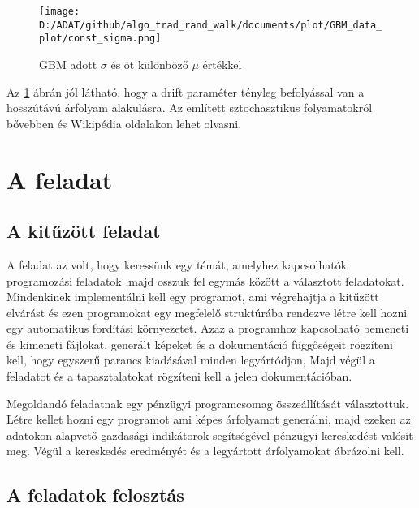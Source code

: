 \documentclass[a4paper, 12pt]{article}
\numberwithin{equation}{section}          %
\numberwithin{figure}{subsection}
\begin{document}
		\begin{figure}[h!]
			\begin{center}
				\texttt{[image: D:/ADAT/github/algo\_trad\_rand\_walk/documents/plot/GBM\_data\_plot/const\_sigma.png]}
			\end{center}
			\caption{GBM adott $\sigma$ és öt különböző $\mu$ értékkel}
			\label{fig:gbm}
		\end{figure}
		
		Az \ref{fig:gbm} ábrán jól látható, hogy a drift paraméter tényleg befolyással van
		a hosszútávú árfolyam alakulásra. Az említett sztochasztikus folyamatokról bővebben
		\cite{brown} és \cite{geobrown} Wikipédia oldalakon lehet olvasni.
		
	
	\clearpage
	
	\section{A feladat}
	
		\subsection{A kitűzött feladat}
	
		A feladat az volt, hogy keressünk egy témát, amelyhez kapcsolhatók programozási feladatok
		,majd osszuk fel egymás között a választott feladatokat. Mindenkinek implementálni kell
		egy programot, ami végrehajtja a kitűzött elvárást és ezen programokat egy megfelelő
		struktúrába rendezve létre kell hozni egy automatikus fordítási környezetet. Azaz 
		a programhoz kapcsolható bemeneti és kimeneti fájlokat, generált képeket és a dokumentáció 
		függőségeit rögzíteni kell, hogy egyszerű parancs kiadásával minden legyártódjon,
		Majd végül a feladatot és a tapasztalatokat rögzíteni kell a jelen dokumentációban.
		
		Megoldandó feladatnak egy pénzügyi programcsomag összeállítását választottuk.
		Létre kellet hozni egy programot ami képes árfolyamot generálni, majd ezeken az
		adatokon alapvető gazdasági indikátorok segítségével pénzügyi kereskedést valósít meg.
		Végül a kereskedés eredményét és a legyártott árfolyamokat ábrázolni kell.

	
		\subsection{A feladatok felosztás}
		
\end{document}
